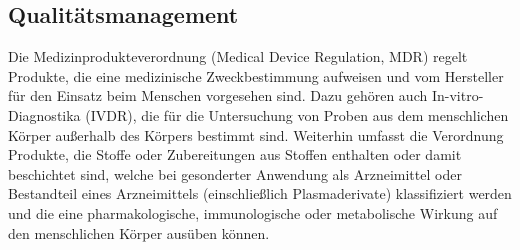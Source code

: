 \documentclass[a4paper, 12pt]{article}
\begin{document}
\newpage
\subsection{Qualitätsmanagement}\label{Qualitätsmanagement}
Die Medizinprodukteverordnung (Medical Device Regulation, MDR) regelt Produkte, die eine medizinische Zweckbestimmung aufweisen und vom Hersteller für den Einsatz beim Menschen vorgesehen sind. Dazu gehören auch In-vitro-Diagnostika (IVDR), die für die Untersuchung von Proben aus dem menschlichen Körper außerhalb des Körpers bestimmt sind. Weiterhin umfasst die Verordnung Produkte, die Stoffe oder Zubereitungen aus Stoffen enthalten oder damit beschichtet sind, welche bei gesonderter Anwendung als Arzneimittel oder Bestandteil eines Arzneimittels (einschließlich Plasmaderivate) klassifiziert werden und die eine pharmakologische, immunologische oder metabolische Wirkung auf den menschlichen Körper ausüben können. \cite{gesund_minist}
\end{document}
